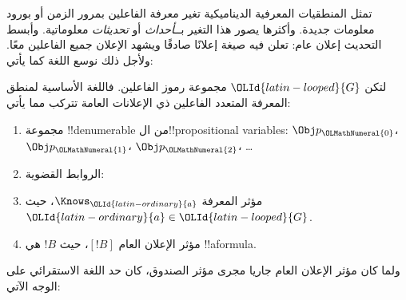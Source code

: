 \documentclass[../../../include/open-logic-section]{subfiles}
\begin{document}


تمثل المنطقيات المعرفية الديناميكية تغير معرفة الفاعلين بمرور الزمن أو
بورود معلومات جديدة. وأكثرها يصور هذا التغير بــ\emph{أحداث} أو
\emph{تحديثات} معلوماتية. وأبسط التحديث إعلان عام: تعلن فيه صيغة إعلانًا
صادقًا ويشهد الإعلان جميع الفاعلين معًا. ولأجل ذلك نوسع اللغة كما يأتي:

\begin{defn}
لتكن ${\OLId{latin-looped}{G}}$ مجموعة رموز الفاعلين. فاللغة الأساسية لمنطق المعرفة المتعدد
الفاعلين ذي الإعلانات العامة تتركب مما يأتي:
\begin{enumerate}
  \item مجموعة !!{denumerable} من ال!!{propositional variable}s:
    $\Obj p_{\OLMathNumeral{0}}$، $\Obj p_{\OLMathNumeral{1}}$، $\Obj p_{\OLMathNumeral{2}}$، \dots
  \item الروابط القضوية: \startycommalist
  \item مؤثر المعرفة $\Knows_{\OLId{latin-ordinary}{a}}$، حيث ${\OLId{latin-ordinary}{a}} \in {\OLId{latin-looped}{G}}$.
  \item مؤثر الإعلان العام $[!B]$، حيث $!B$ هي !!a{formula}.
\end{enumerate}
\end{defn}

ولما كان مؤثر الإعلان العام جاريا مجرى مؤثر الصندوق، كان حد اللغة
الاستقرائي على الوجه الآتي:
\end{document}
